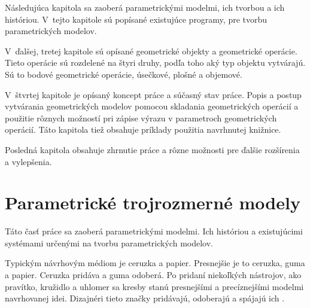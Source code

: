 Následujúca kapitola sa zaoberá parametrickými modelmi, ich tvorbou a ich históriou.
V~tejto kapitole sú popísané existujúce programy, pre tvorbu parametrických modelov.


V~ďalšej, tretej kapitole sú opísané geometrické objekty a geometrické operácie. Tieto operácie sú rozdelené na štyri druhy, podľa toho aký typ objektu vytvárajú. Sú to bodové geometrické operácie, úsečkové, plošné a objemové. 


V~štvrtej kapitole je opísaný koncept práce a súčasný stav práce. Popis a postup vytvárania geometrických modelov pomocou skladania geometrických operácií a použitie rôznych možností pri zápise výrazu v parametroch geometrických operácií. Táto kapitola tiež obsahuje príklady použitia navrhnutej knižnice.



Posledná kapitola obsahuje zhrnutie práce a rôzne možnosti pre ďalšie rozšírenia a vylepšenia.

\chapter{Parametrické trojrozmerné modely}
Táto časť práce sa zaoberá parametrickými modelmi. Ich históriou a existujúcimi systémami určenými na tvorbu parametrických modelov.


Typickým návrhovým médiom je ceruzka a papier. Presnejšie je to ceruzka, guma a papier. Ceruzka pridáva a guma odoberá. Po pridaní niekoľkých nástrojov, ako pravítko, kružidlo a uhlomer sa kresby stanú presnejšími a precíznejšími modelmi navrhovanej idei. Dizajnéri tieto značky pridávajú, odoberajú a spájajú ich  \cite{woodbury2010elements}.

